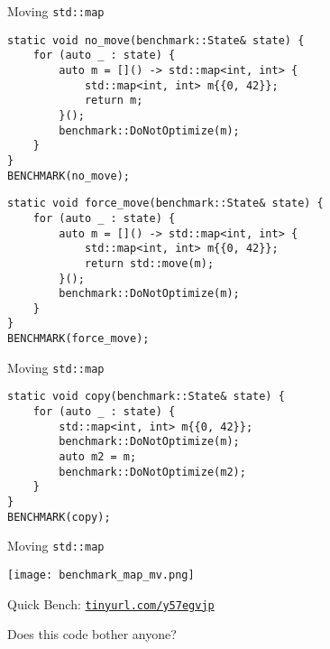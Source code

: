 \begin{frame}[fragile]{Moving \texttt{std::map}}
    \begin{lstlisting}
static void no_move(benchmark::State& state) {
    for (auto _ : state) {
        auto m = []() -> std::map<int, int> {
            std::map<int, int> m{{0, 42}};
            return m;
        }();
        benchmark::DoNotOptimize(m);
    }
}
BENCHMARK(no_move);
    \end{lstlisting}

    \begin{lstlisting}
static void force_move(benchmark::State& state) {
    for (auto _ : state) {
        auto m = []() -> std::map<int, int> {
            std::map<int, int> m{{0, 42}};
            return std::move(m);
        }();
        benchmark::DoNotOptimize(m);
    }
}
BENCHMARK(force_move);
    \end{lstlisting}
\end{frame}
\begin{frame}[fragile]{Moving \texttt{std::map}}
    \begin{lstlisting}
static void copy(benchmark::State& state) {
    for (auto _ : state) {
        std::map<int, int> m{{0, 42}};
        benchmark::DoNotOptimize(m);
        auto m2 = m;
        benchmark::DoNotOptimize(m2);
    }
}
BENCHMARK(copy);
    \end{lstlisting}
\end{frame}

\begin{frame}{Moving \texttt{std::map}}
    \centering
    \scalebox{1.5}{Quick Bench result}

    \texttt{[image: benchmark\_map\_mv.png]}

    Quick Bench: \href{http://quick-bench.com/7L-__vxvraDDacztJoalrjBrMUA}{\texttt{tinyurl.com/y57egvjp}}
\end{frame}

\begin{frame}
    \centering
    \scalebox{5}{Why?}
\end{frame}

\begin{frame}[fragile]{Does this code bother anyone?}
\end{frame}

\begin{frame}
    \centering
    \scalebox{2}{Interlude}

\end{frame}

